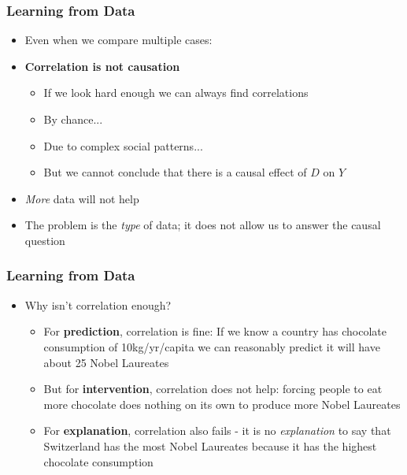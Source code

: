 \documentclass[xcolor=x11names,compress]{beamer}\usepackage[]{graphicx}\usepackage[]{color}
\renewcommand{\(}{\begin{columns}}
\renewcommand{\)}{\end{columns}}
\newcommand{\<}[1]{\begin{column}{#1}}
\renewcommand{\>}{\end{column}}
\begin{document}
\begin{frame}
\frametitle{Learning from Data}
\begin{itemize}
\item Even when we compare multiple cases: 
\pause
\item \textbf{Correlation is not causation}
\pause
\begin{itemize}
\item If we look hard enough we can always find correlations
\pause
\item By chance...
\pause
\item Due to complex social patterns...
\pause
\item But we cannot conclude that there is a causal effect of $D$ on $Y$
\pause
\end{itemize}
\item \textit{More} data will not help
\pause
\item The problem is the \textit{type} of data; it does not allow us to answer the causal question 
\end{itemize}
\end{frame}









\begin{frame}
\frametitle{Learning from Data}
\begin{itemize}
\item Why isn't correlation enough?
\pause
\begin{itemize}
\item For \textbf{prediction}, correlation is fine: If we know a country has chocolate consumption of 10kg/yr/capita we can reasonably predict it will have about 25 Nobel Laureates
\pause
\item But for \textbf{intervention}, correlation does not help: forcing people to eat more chocolate does nothing on its own to produce more Nobel Laureates
\pause
\item For \textbf{explanation}, correlation also fails - it is no \textit{explanation} to say that Switzerland has the most Nobel Laureates because it has the highest chocolate consumption
\end{itemize}
\end{itemize}
\end{frame}
\end{document}
